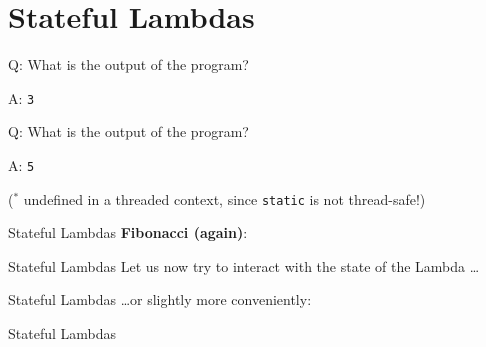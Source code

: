 \begin{frame}
    \centering
    \scalebox{3}{Stateful Lambdas}
\end{frame}

\section{Stateful Lambdas}

\begin{frame}[fragile]{Q: What is the output of the program?}
\end{frame}

\addtocounter{framenumber}{-1}
\begin{frame}[fragile]{A: \texttt{3}}
\end{frame}

\begin{frame}[fragile]{Q: What is the output of the program?}
\end{frame}

\addtocounter{framenumber}{-1}
\begin{frame}[fragile]{A: \texttt{5}}

    \begin{center}
        ($^*$ undefined in a threaded context, since \texttt{static} is not thread-safe!)
    \end{center}
\end{frame}

\begin{frame}[fragile]{Stateful Lambdas}
    \textbf{Fibonacci (again)}:
\end{frame}

\begin{frame}[fragile]{Stateful Lambdas}
    Let us now try to interact with the state of the Lambda \ldots
\end{frame}

\begin{frame}[fragile]{Stateful Lambdas}
    \ldots or slightly more conveniently:
\end{frame}

\begin{frame}[fragile]{Stateful Lambdas}
    \begin{columns}[t]
        \begin{column}{.6\textwidth}
        \end{column}
        \begin{column}{.35\textwidth}
        \end{column}
    \end{columns}
\end{frame}

